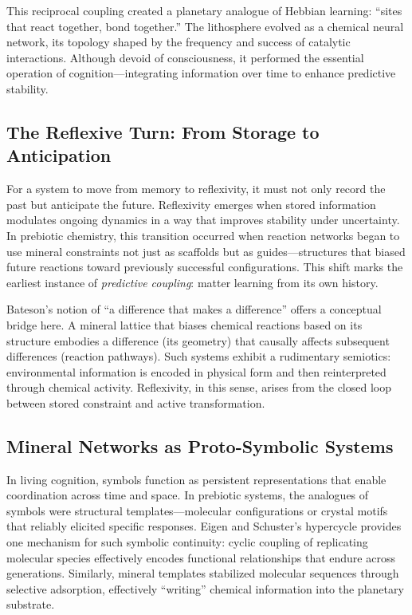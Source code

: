 \documentclass[11pt,a4paper]{article}
\begin{document}
This reciprocal coupling created a planetary analogue of Hebbian learning: “sites that react together, bond together.”  The lithosphere evolved as a chemical neural network, its topology shaped by the frequency and success of catalytic interactions.  Although devoid of consciousness, it performed the essential operation of cognition—integrating information over time to enhance predictive stability.

\subsection{The Reflexive Turn: From Storage to Anticipation}

For a system to move from memory to reflexivity, it must not only record the past but anticipate the future.  Reflexivity emerges when stored information modulates ongoing dynamics in a way that improves stability under uncertainty.  In prebiotic chemistry, this transition occurred when reaction networks began to use mineral constraints not just as scaffolds but as guides—structures that biased future reactions toward previously successful configurations.  This shift marks the earliest instance of \emph{predictive coupling}: matter learning from its own history.

Bateson’s notion of “a difference that makes a difference” \citep{Bateson1972StepsToAnEcologyOfMind} offers a conceptual bridge here.  A mineral lattice that biases chemical reactions based on its structure embodies a difference (its geometry) that causally affects subsequent differences (reaction pathways).  Such systems exhibit a rudimentary semiotics: environmental information is encoded in physical form and then reinterpreted through chemical activity.  Reflexivity, in this sense, arises from the closed loop between stored constraint and active transformation.

\subsection{Mineral Networks as Proto-Symbolic Systems}

In living cognition, symbols function as persistent representations that enable coordination across time and space.  In prebiotic systems, the analogues of symbols were structural templates—molecular configurations or crystal motifs that reliably elicited specific responses.  Eigen and Schuster’s hypercycle \citep{Eigen1971Selforganization, Eigen1979HypercycleBook} provides one mechanism for such symbolic continuity: cyclic coupling of replicating molecular species effectively encodes functional relationships that endure across generations.  Similarly, mineral templates stabilized molecular sequences through selective adsorption, effectively “writing” chemical information into the planetary substrate.
\end{document}
